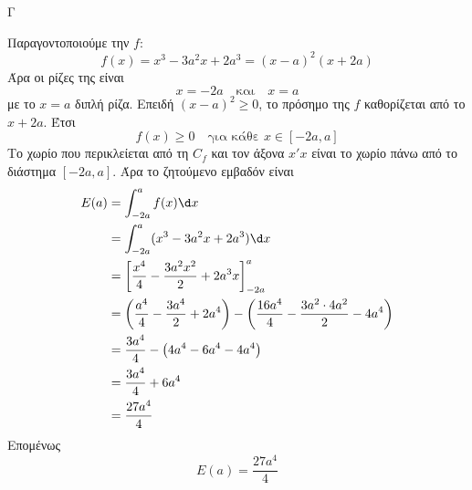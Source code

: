 \begin{thema}{Γ}
\begin{erwthma}
\item Παραγοντοποιούμε την $f$:
\[
f(x)=x^3-3a^2x+2a^3=(x-a)^2(x+2a)
\]
Άρα οι ρίζες της είναι
\[
x=-2a\quad \text{και}\quad x=a
\]
με το $x=a$ διπλή ρίζα.
Επειδή $(x-a)^2\geq 0$, το πρόσημο της $f$ καθορίζεται από το $x+2a$.
Έτσι
\[
f(x)\geq 0\quad \text{για κάθε }x\in[-2a,a]
\]
Το χωρίο που περικλείεται από τη $C_f$ και τον άξονα $x'x$ είναι το χωρίο πάνω από το διάστημα $[-2a,a]$.
Άρα το ζητούμενο εμβαδόν είναι
\begin{align*}
E(a)
&=\dint_{-2a}^{a}f(x)\d x\\
&=\dint_{-2a}^{a}(x^3-3a^2x+2a^3)\d x\\
&=\left[\frac{x^4}{4}-\frac{3a^2x^2}{2}+2a^3x\right]_{-2a}^{a}\\
&=\left(\frac{a^4}{4}-\frac{3a^4}{2}+2a^4\right)
-\left(\frac{16a^4}{4}-\frac{3a^2\cdot 4a^2}{2}-4a^4\right)\\
&=\frac{3a^4}{4}-\left(4a^4-6a^4-4a^4\right)\\
&=\frac{3a^4}{4}+6a^4\\
&=\frac{27a^4}{4}
\end{align*}
Επομένως
\[
E(a)=\frac{27a^4}{4}
\]
\end{erwthma}
\end{thema}

